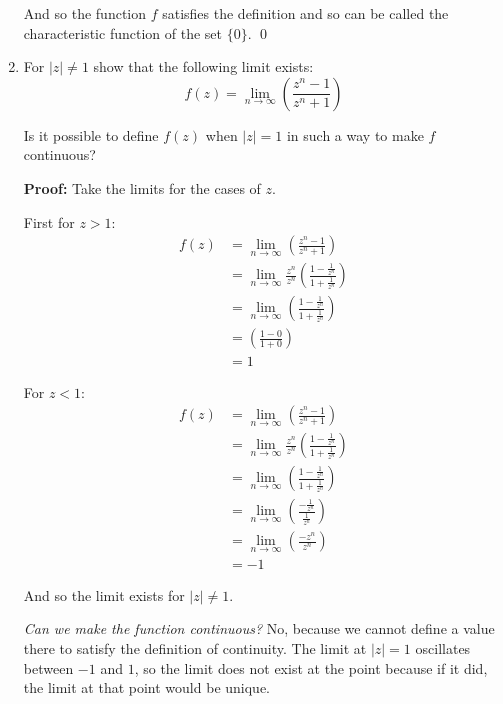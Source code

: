 \begin{enumerate}
	      And so the function $f$ satisfies the definition and so can be called the characteristic function of the set $\{0\}$.
	      \qed

	\item For $|z| \neq 1$ show that the following limit exists:
	      \[ f(z) = \lim_{n \to \infty} \left( \frac{z^n - 1}{z^n + 1} \right) \]

	      Is it possible to define $f(z)$ when $|z| = 1$ in such a way to make $f$ continuous?

	      \textbf{Proof:}
	      Take the limits for the cases of $z$.

	      First for $z > 1$:
	      \begin{align*}
		      f(z) & = \lim_{n \to \infty} \left( \frac{z^n - 1}{z^n + 1} \right)                                     \\
		           & = \lim_{n \to \infty} \frac{z^n}{z^n} \left( \frac{1 - \frac{1}{z^n}}{1 + \frac{1}{z^n}} \right) \\
		           & = \lim_{n \to \infty} \left( \frac{1 - \frac{1}{z^n}}{1 + \frac{1}{z^n}} \right)                 \\
		           & = \left( \frac{1 - 0}{1 + 0} \right)                                                             \\
		           & = 1
	      \end{align*}

	      For $z < 1$:
	      \begin{align*}
		      f(z) & = \lim_{n \to \infty} \left( \frac{z^n - 1}{z^n + 1} \right)                                     \\
		           & = \lim_{n \to \infty} \frac{z^n}{z^n} \left( \frac{1 - \frac{1}{z^n}}{1 + \frac{1}{z^n}} \right) \\
		           & = \lim_{n \to \infty} \left( \frac{1 - \frac{1}{z^n}}{1 + \frac{1}{z^n}} \right)                 \\
		           & = \lim_{n \to \infty} \left( \frac{- \frac{1}{z^n}}{\frac{1}{z^n}} \right)                       \\
		           & = \lim_{n \to \infty} \left( \frac{- z^n}{{z^n}} \right)                                         \\
		           & = -1
	      \end{align*}

	      And so the limit exists for $|z| \not = 1.$

	      \emph{Can we make the function continuous?} No, because we cannot define a value there to satisfy the definition of continuity. The limit at
	      $|z| = 1$ oscillates between $-1$ and $1$, so the limit does not exist at the point because if it did, the limit at that point would be unique.


\end{enumerate}
